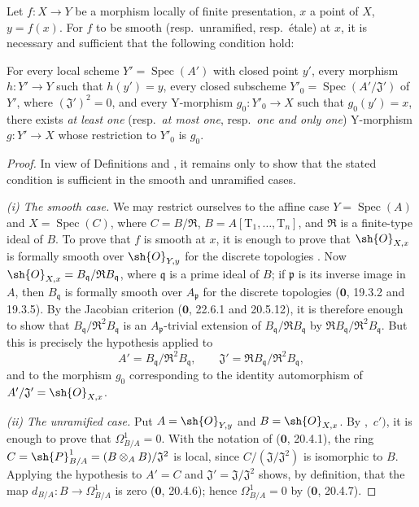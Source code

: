 
\begin{proposition}[17.14.1]
\label{IV.17.14.1}
Let $f:X\to Y$ be a morphism locally of finite presentation, $x$ a point of $X$, $y=f(x)$.
For $f$ to be smooth (resp.\ unramified, resp.\ \'etale) at $x$, it is necessary and sufficient that the following condition hold:

For every local scheme $Y'=\operatorname{Spec}(A')$ with closed point $y'$, every morphism $h:Y'\to Y$ such that $h(y')=y$, every closed subscheme $Y'_0=\operatorname{Spec}(A'/\mathfrak J')$ of $Y'$, where $(\mathfrak J')^2=0$, and every Y-morphism $g_0:Y'_0\to X$ such that $g_0(y')=x$, there exists \emph{at least one} (resp.\ \emph{at most one}, resp.\ \emph{one and only one}) Y-morphism $g:Y'\to X$ whose restriction to $Y'_0$ is $g_0$.
\end{proposition}

\begin{proof}
In view of Definitions  and , it remains only to show that the stated condition is sufficient in the smooth and unramified cases.

\emph{(i) The smooth case.}
We may restrict ourselves to the affine case $Y=\operatorname{Spec}(A)$ and $X=\operatorname{Spec}(C)$, where
$C=B/\mathfrak R$, $B=A[\mathrm{T}_1,\ldots,\mathrm{T}_n]$, and $\mathfrak R$ is a finite-type ideal of $B$.
To prove that $f$ is smooth at $x$, it is enough to prove that $\sh{O}_{X,x}$ is formally smooth over $\sh{O}_{Y,y}$ for the discrete topologies .
Now $\sh{O}_{X,x}=B_{\mathfrak q}/\mathfrak RB_{\mathfrak q}$, where $\mathfrak q$ is a prime ideal of $B$; if $\mathfrak p$ is its inverse image in $A$, then $B_{\mathfrak q}$ is formally smooth over $A_{\mathfrak p}$ for the discrete topologies ($\mathbf{0}$, 19.3.2 and 19.3.5).
By the Jacobian criterion ($\mathbf{0}$, 22.6.1 and 20.5.12), it is therefore enough to show that
$B_{\mathfrak q}/\mathfrak R^2B_{\mathfrak q}$ is an $A_{\mathfrak p}$-trivial extension of
$B_{\mathfrak q}/\mathfrak RB_{\mathfrak q}$ by
$\mathfrak RB_{\mathfrak q}/\mathfrak R^2B_{\mathfrak q}$.
But this is precisely the hypothesis applied to
\[
 A'=B_{\mathfrak q}/\mathfrak R^2B_{\mathfrak q},\qquad
 \mathfrak J'=\mathfrak RB_{\mathfrak q}/\mathfrak R^2B_{\mathfrak q},
\]
and to the morphism $g_0$ corresponding to the identity automorphism of
$A'/\mathfrak J'=\sh{O}_{X,x}$.

\emph{(ii) The unramified case.}
Put $A=\sh{O}_{Y,y}$ and $B=\sh{O}_{X,x}$.
By ,~$c')$, it is enough to prove that $\Omega^1_{B/A}=0$.
With the notation of ($\mathbf{0}$, 20.4.1), the ring
$C=\sh{P}^1_{B/A}=(B\otimes_AB)/\mathfrak J^2$ is local, since
$C/(\mathfrak J/\mathfrak J^2)$ is isomorphic to $B$.
Applying the hypothesis to $A'=C$ and $\mathfrak J'=\mathfrak J/\mathfrak J^2$ shows, by definition, that the map
$d_{B/A}:B\to\Omega^1_{B/A}$ is zero ($\mathbf{0}$, 20.4.6); hence $\Omega^1_{B/A}=0$ by ($\mathbf{0}$, 20.4.7).
\end{proof}

